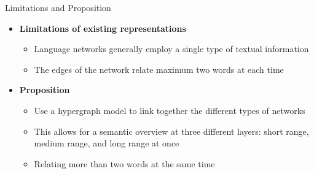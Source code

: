 \documentclass[10pt,=table]{beamer}
\begin{document}
\begin{frame}{Limitations and Proposition}
\begin{itemize}
\item<1-> \large \textbf{Limitations of existing representations}
	\begin{itemize}
	\item<1-> Language networks generally employ a single type of textual information
	\item<1-> The edges of the network relate maximum two words at each time
	\end{itemize}
\item<2-> \large \textbf{Proposition}
	\begin{itemize}
	\item<2-> Use a hypergraph model to link together the different types of networks
	\item<2-> This allows for a semantic overview at three different layers: short range, medium range, and long range at once
	\item<2-> Relating more than two words at the same time
	\end{itemize}
\end{itemize}
\vspace{\textheight}
\end{frame}
\end{document}
